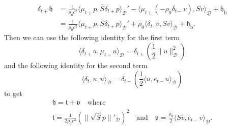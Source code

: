 \documentclass[dvipsnames]{article}
\begin{document}
\begin{align}
    \delta_{t+}\mathfrak{h} &= \frac{1}{\rho_0 c^2}\langle \mu_{t+}p, \bar S \delta_{t+}p \rangle_{\mathcal{D}}' -\langle \mu_{t+}(-\rho_0\delta_{t-}v), Sv\rangle_{\underline{\mathcal{D}}} + \mathfrak{h}_\text{b}\\
    &= \frac{1}{\rho_0 c^2}\langle \mu_{t+}p, \bar S \delta_{t+}p \rangle_{\mathcal{D}}' + \rho_0 \langle \delta_{t\cdot}v, Sv\rangle_{\underline{\mathcal{D}}} + \mathfrak{h}_\text{b}.
\end{align}
Then we can use the following identity for the first term
\begin{equation}
    \langle\delta_{t+}u, \mu_{t+}u\rangle_\mathcal{D} = \delta_{t+}\left(\frac{1}{2}\lVert u\rVert^2_\mathcal{D}\right)
\end{equation}
and the following identity for the second term
\begin{equation}
    \langle\delta_{t\cdot}u, u\rangle_\mathcal{D} = \delta_{t+}\left(\frac{1}{2}\langle u,e_{t-}u\rangle_\mathcal{D}\right)
\end{equation}
to get
\begin{equation}
    \begin{gathered}
        \mathfrak{h} = \mathfrak{t} + \mathfrak{v}\quad \text{where}\\
       \mathfrak{t} = \frac{1}{2\rho_0 c^2}\left(\lVert\sqrt{\bar S }p\rVert'_\mathcal{D}\right)^2\quad \text{and} \quad \mathfrak{v} = \frac{\rho_0}{2}\langle Sv, e_{t-}v\rangle_{\underline{\mathcal{D}}}.
    \end{gathered}
\end{equation}
\end{document}
